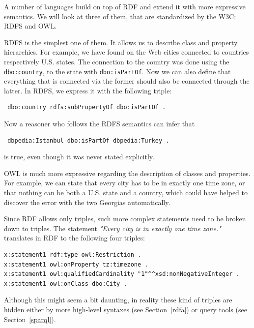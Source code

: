 A number of languages build on top of RDF and extend it with more expressive semantics.
We will look at three of them, that are standardized by the W3C: RDFS and OWL. %

RDFS is the simplest one of them.
It allows us to describe class and property hierarchies.
For example, we have found on the Web cities connected to countries respectively U.S. states.
The connection to the country was done using the \texttt{dbo:country}, to the state with \texttt{dbo:isPartOf}.
Now we can also define that everything that is connected via the former should also be connected through the latter.
In RDFS, we express it with the following triple:

\begin{verbatim}
 dbo:country rdfs:subPropertyOf dbo:isPartOf .
\end{verbatim}

Now a reasoner who follows the RDFS semantics can infer that

\begin{verbatim}
 dbpedia:Istanbul dbo:isPartOf dbpedia:Turkey .
\end{verbatim}

is true, even though it was never stated explicitly.

OWL is much more expressive regarding the description of classes and properties.
For example, we can state that every city has to be in exactly one time zone, or that nothing can be both a U.S. state and a country, which could have helped to discover the error with the two Georgias automatically.

Since RDF allows only triples, such more complex statements need to be broken down to triples.
The statement \textit{"Every city is in exactly one time zone."} translates in RDF to the following four triples:

\begin{verbatim}
x:statement1 rdf:type owl:Restriction .
x:statement1 owl:onProperty tz:timezone .
x:statement1 owl:qualifiedCardinality "1"^^xsd:nonNegativeInteger .
x:statement1 owl:onClass dbo:City .
\end{verbatim}

Although this might seem a bit daunting, in reality these kind of triples are hidden either by more high-level syntaxes (see Section~\ref{rdfa}) or query tools (see Section~\ref{sparql}).

%

